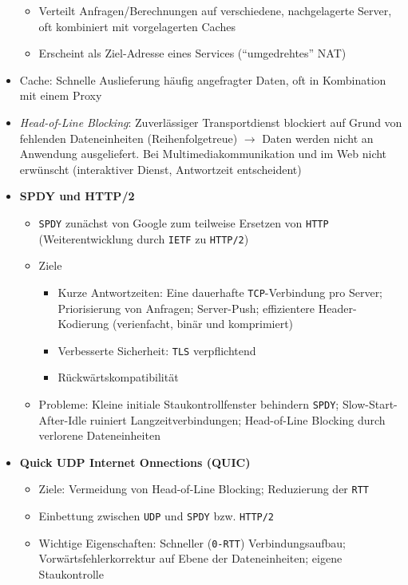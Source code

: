 \begin{itemize}
\begin{itemize}
		\item Verteilt Anfragen/Berechnungen auf verschiedene, nachgelagerte Server, oft kombiniert mit vorgelagerten Caches
		\item Erscheint als Ziel-Adresse eines Services ("`umgedrehtes"' NAT)
	\end{itemize}
	\item Cache: Schnelle Auslieferung häufig angefragter Daten, oft in Kombination mit einem Proxy
	\item \textit{Head-of-Line Blocking}: Zuverlässiger Transportdienst blockiert auf Grund von fehlenden Dateneinheiten (Reihenfolgetreue) \(\rightarrow\) Daten werden nicht an Anwendung ausgeliefert. Bei Multimediakommunikation und im Web nicht erwünscht (interaktiver Dienst, Antwortzeit entscheident)
	\item \textbf{SPDY und HTTP/2}
	\begin{itemize}
		\item \texttt{SPDY} zunächst von Google zum teilweise Ersetzen von \texttt{HTTP} (Weiterentwicklung durch \texttt{IETF} zu \texttt{HTTP/2})
		\item Ziele
		\begin{itemize}
			\item Kurze Antwortzeiten: Eine dauerhafte \texttt{TCP}-Verbindung pro Server; Priorisierung von Anfragen; Server-Push; effizientere Header-Kodierung (verienfacht, binär und komprimiert)
			\item Verbesserte Sicherheit: \texttt{TLS} verpflichtend 
			\item Rückwärtskompatibilität
		\end{itemize}
		\item Probleme: Kleine initiale Staukontrollfenster behindern \texttt{SPDY}; Slow-Start-After-Idle ruiniert Langzeitverbindungen; Head-of-Line Blocking durch verlorene Dateneinheiten
	\end{itemize}
	\item \textbf{Quick UDP Internet Onnections (QUIC)}
	\begin{itemize}
		\item Ziele: Vermeidung von Head-of-Line Blocking; Reduzierung der \texttt{RTT}
		\item Einbettung zwischen \texttt{UDP} und \texttt{SPDY} bzw. \texttt{HTTP/2}
		\item Wichtige Eigenschaften: Schneller (\texttt{0-RTT}) Verbindungsaufbau; Vorwärtsfehlerkorrektur auf Ebene der Dateneinheiten; eigene Staukontrolle
	\end{itemize}
\end{itemize}

